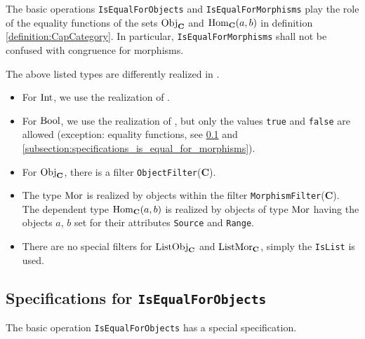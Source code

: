 \begin{remark}
 The basic operations \texttt{IsEqualForObjects} and \texttt{IsEqualForMorphisms} play the role
 of the equality functions of the sets $\mathrm{Obj}_{\mathbf{C}}$ and $\operatorname{\mathrm{Hom}}_{\mathbf{C}}(a,b)$ in definition
 \ref{definition:CapCategory}. In particular, \texttt{IsEqualForMorphisms} shall not be confused
 with congruence for morphisms.
\end{remark}

\begin{remark}\label{remark:realization_of_types}
 The above listed types are differently realized in \CapPkg.
 \begin{itemize}
  \item For $\mathrm{Int}$, we use the realization of \GAP.
  \item For $\mathrm{Bool}$, we use the realization of \GAP, but only the values \texttt{true} and \texttt{false}
  are allowed (exception: equality functions, see \ref{subsection:specifications_is_equal_for_objects} and \ref{subsection:specifications_is_equal_for_morphisms}).
  \item For $\mathrm{Obj}_{\mathbf{C}}$, there is a \GAP filter \texttt{ObjectFilter}($\mathbf{C}$).
  \item The type $\mathrm{Mor}$ is realized by \GAP objects within the filter \texttt{MorphismFilter}($\mathbf{C}$). 
  The dependent type $\operatorname{\mathrm{Hom}}_{\mathbf{C}}( a, b )$ is realized by objects of type $\mathrm{Mor}$ having the objects $a$, $b$ set
 for their attributes \texttt{Source} and \texttt{Range}. 
  \item There are no special \GAP filters for $\mathrm{ListObj}_{\mathbf{C}}$ and $\mathrm{ListMor}_{\mathbf{C}}$, simply the \GAP \texttt{IsList}
  is used.
\end{itemize}
\end{remark}

\subsection{Specifications for \texttt{IsEqualForObjects}}\label{subsection:specifications_is_equal_for_objects}
The basic operation \texttt{IsEqualForObjects} has a special specification.

